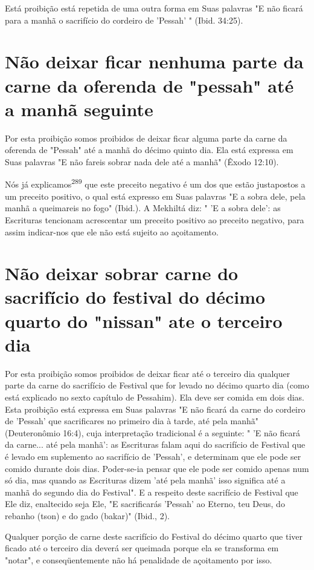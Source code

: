\begin{itemize}
\begin{enumrate}
\begin{itemize}
\begin{itemize}
\begin{itemize}
Está proibição está repetida de uma outra forma em Suas palavras "E não
ficará para a manhã o sacrifício do cordeiro de 'Pessah' " (Ibid.
34:25).

\section{Não deixar ficar nenhuma parte da carne da oferenda de "pessah" 
até a manhã seguinte}

Por esta proibição somos proibidos de deixar ficar alguma parte da carne
da oferenda de "Pessah" até a manhã do décimo quinto dia. Ela está
ex­pressa em Suas palavras "E não fareis sobrar nada dele até a manhã"
(Êxodo 12:10).

Nós já explicamos\textsuperscript{289} que este preceito negativo é um
dos que es­tão justapostos a um preceito positivo, o qual está expresso
em Suas palavras "E a sobra dele, pela manhã a queimareis no fogo"
(Ibid.). A Mekhiltá diz: " 'E a sobra dele': as Escrituras tencionam
acrescentar um preceito positivo ao pre­ceito negativo, para assim
indicar-nos que ele não está sujeito ao açoitamento.

\section{Não deixar sobrar carne do sacrifício do festival do décimo
quarto do "nissan" ate o terceiro dia}

Por esta proibição somos proibidos de deixar ficar até o terceiro dia
qualquer parte da carne do sacrifício de Festival que for levado no
décimo quarto dia (como está explicado no sexto capítulo de Pessahim).
Ela deve ser comida em dois dias. Esta proibição está expressa em Suas
palavras "E não ficará da carne do cordeiro de 'Pessah' que sacrificares
no primeiro dia à tarde, até pela manhã" (Deuteronômio 16:4), cuja
interpretação tradicional é a seguinte: " 'E não ficará da carne... até
pela manhã': as Escrituras falam aqui do sacrifício de Festival que é
levado em suplemento ao sacrifício de 'Pessah', e determinam que ele
pode ser comido durante dois dias. Poder-se-ia pensar que ele pode ser
comido apenas num só dia, mas quando as Escrituras dizem 'até pela
manhã' isso significa até a manhã do segundo dia do Festival". E a
respeito deste sacri­fício de Festival que Ele diz, enaltecido seja Ele,
"E sacrificarás 'Pessah' ao Eter­no, teu Deus, do rebanho (tson) e do
gado (bakar)" (Ibid., 2).

Qualquer porção de carne deste sacrifício do Festival do décimo quar­to
que tiver ficado até o terceiro dia deverá ser queimada porque ela se
trans­forma em "notar", e conseqüentemente não há penalidade de
açoitamento por isso.


\end{itemize}
\end{itemize}
\end{itemize}
\end{enumrate}
\end{itemize}

